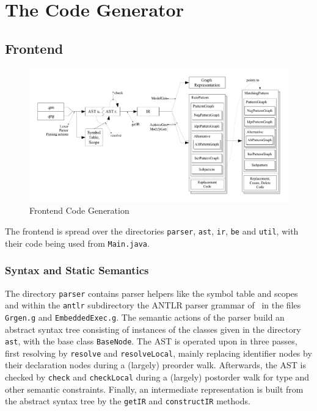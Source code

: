 \section{The Code Generator}

\subsection{Frontend}

\begin{figure}[htbp]
  \centering
  \includegraphics[width=\textwidth]{fig/AblaufCodeerzeugungFrontend}
  \caption{Frontend Code Generation}
  \label{figfrontendcodegen}
\end{figure}

The frontend is spread over the directories \texttt{parser}, \texttt{ast}, \texttt{ir}, \texttt{be} and \texttt{util}, with their code being used from \texttt{Main.java}.

\subsubsection*{Syntax and Static Semantics}
The directory \texttt{parser} contains parser helpers like the symbol table and scopes and within the \texttt{antlr} subdirectory the ANTLR parser grammar of \GrG~in the files \texttt{Grgen.g} and \texttt{EmbeddedExec.g}.
The semantic actions of the parser build an abstract syntax tree consisting of instances of the classes given in the directory \texttt{ast}, with the base class \texttt{BaseNode}.
The AST is operated upon in three passes, first resolving by \texttt{resolve} and \texttt{resolveLocal}, mainly replacing identifier nodes by their declaration nodes during a (largely) preorder walk.
Afterwards, the AST is checked by \texttt{check} and \texttt{checkLocal} during a (largely) postorder walk for type and other semantic constraints.
Finally, an intermediate representation is built from the abstract syntax tree by the \texttt{getIR} and \texttt{constructIR} methods.

